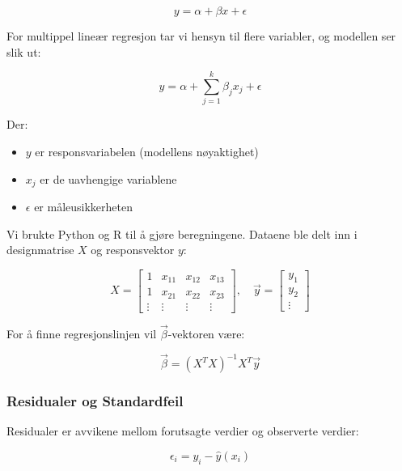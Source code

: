 \documentclass{article}
\begin{document}
\begin{equation}
    y = \alpha + \beta x + \epsilon
\end{equation}

For multippel lineær regresjon tar vi hensyn til flere variabler, og modellen ser slik ut:

\begin{equation}
    y = \alpha + \sum_{j=1}^{k} \beta_j x_j + \epsilon
\end{equation}

Der:
\begin{itemize}
    \item $y$ er responsvariabelen (modellens nøyaktighet)
    \item $x_j$ er de uavhengige variablene
    \item $\epsilon$ er måleusikkerheten
\end{itemize}

Vi brukte Python og R til å gjøre beregningene. Dataene ble delt inn i designmatrise $X$ og responsvektor $y$:

\begin{equation}
    X = \begin{bmatrix}
    1 & x_{11} & x_{12} & x_{13} \\
    1 & x_{21} & x_{22} & x_{23} \\
    \vdots & \vdots & \vdots & \vdots
    \end{bmatrix}, \quad
    \vec{y} = \begin{bmatrix}
    y_1 \\
    y_2 \\
    \vdots
    \end{bmatrix}
\end{equation}

For å finne regresjonslinjen vil $\vec{\beta}$-vektoren være:

\begin{equation}
    \vec{\beta} = (X^TX)^{-1} X^T \vec{y}
\end{equation}

\subsubsection{Residualer og Standardfeil}
Residualer er avvikene mellom forutsagte verdier og observerte verdier:

\begin{equation}
    \epsilon_i = y_i - \hat{y}(x_i)
\end{equation}
\end{document}
